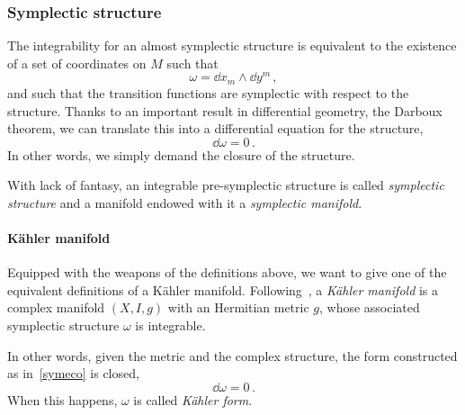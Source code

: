 \documentclass[debug]{phd}
\begin{document}
				\subsubsection{Symplectic structure}
						The integrability for an almost symplectic structure is equivalent to the existence of a set of coordinates on $M$ such that
								\begin{equation}
									\omega = \dd x_m \wedge \dd y^m\, ,
								\end{equation}
						and such that the transition functions are symplectic with respect to the structure.
						Thanks to an important result in differential geometry, the Darboux theorem, we can translate this into a differential equation for the structure,
								\begin{equation}
									\dd \omega = 0\, .
								\end{equation}
						In other words, we simply demand the closure of the structure.
						
						With lack of fantasy, an integrable pre-symplectic structure is called \emph{symplectic structure} and a manifold endowed with it a \emph{symplectic manifold}.
						
					\paragraph{K\"ahler manifold} Equipped with the weapons of the definitions above, we want to give one of the equivalent definitions of a K\"ahler manifold.
					Following~\cite{KahlBook}, a \emph{K\"ahler manifold} is a complex manifold $(X, I, g)$ with an Hermitian metric $g$, whose associated symplectic structure $\omega$ is integrable.
					
					In other words, given the metric and the complex structure, the form constructed as in~\eqref{symeco} is closed,
							\begin{equation}
								\dd \omega = 0\, .
							\end{equation}
					When this happens, $\omega$ is called \emph{K\"ahler form}.
\end{document}
